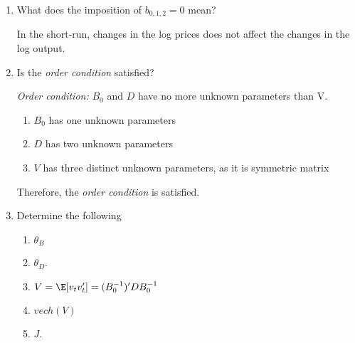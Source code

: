 \begin{enumerate}
    \item What does the imposition of $b_{0, 1, 2} = 0$ mean?

          \begin{sol}
              In the short-run, changes in the log prices does not affect the changes in the log output.
          \end{sol}

    \item Is the \emph{order condition} satisfied?

          \begin{sol}
              \begin{definition}
                  \emph{Order condition:} $B_0$ and $D$ have no more unknown parameters than V.
              \end{definition}

              \begin{enumerate}[label=$\bullet$]
                  \item $B_0$ has one unknown parameters

                  \item $D$ has two unknown parameters

                  \item $V$ has three distinct unknown parameters, as it is symmetric matrix
              \end{enumerate}
              Therefore, the \emph{order condition} is satisfied.
          \end{sol}

    \item Determine the following
          \begin{enumerate}[label=\roman*.]
              \item $\theta_B$
              \item $\theta_D$.
              \item $V = \E[v_t v_t'] = (B_0^{-1})' D B_0^{-1}$
              \item $vech(V)$
              \item $J$.
          \end{enumerate}



\end{enumerate}
